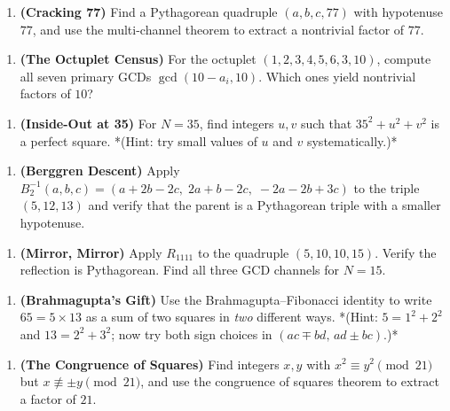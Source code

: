 \documentclass[11pt,openany]{book}
\theoremstyle{definition}
\theoremstyle{plain}
\theoremstyle{remark}
\begin{document}
\begin{enumerate}
\item \textbf{(Cracking 77)} Find a Pythagorean quadruple $(a, b, c, 77)$ with hypotenuse $77$, and use the multi-channel theorem to extract a nontrivial factor of $77$.
\end{enumerate}

\begin{enumerate}
\item \textbf{(The Octuplet Census)} For the octuplet $(1, 2, 3, 4, 5, 6, 3, 10)$, compute all seven primary GCDs $\gcd(10 - a_i, 10)$. Which ones yield nontrivial factors of $10$?
\end{enumerate}

\begin{enumerate}
\item \textbf{(Inside-Out at 35)} For $N = 35$, find integers $u, v$ such that $35^2 + u^2 + v^2$ is a perfect square. *(Hint: try small values of $u$ and $v$ systematically.)*
\end{enumerate}

\begin{enumerate}
\item \textbf{(Berggren Descent)} Apply $B_2^{-1}(a, b, c) = (a + 2b - 2c,\; 2a + b - 2c,\; -2a - 2b + 3c)$ to the triple $(5, 12, 13)$ and verify that the parent is a Pythagorean triple with a smaller hypotenuse.
\end{enumerate}

\begin{enumerate}
\item \textbf{(Mirror, Mirror)} Apply $R_{1111}$ to the quadruple $(5, 10, 10, 15)$. Verify the reflection is Pythagorean. Find all three GCD channels for $N = 15$.
\end{enumerate}

\begin{enumerate}
\item \textbf{(Brahmagupta's Gift)} Use the Brahmagupta–Fibonacci identity to write $65 = 5 \times 13$ as a sum of two squares in \textit{two} different ways. *(Hint: $5 = 1^2 + 2^2$ and $13 = 2^2 + 3^2$; now try both sign choices in $(ac \mp bd, \, ad \pm bc)$.)*
\end{enumerate}

\begin{enumerate}
\item \textbf{(The Congruence of Squares)} Find integers $x, y$ with $x^2 \equiv y^2 \pmod{21}$ but $x \not\equiv \pm y \pmod{21}$, and use the congruence of squares theorem to extract a factor of $21$.
\end{enumerate}
\end{document}
